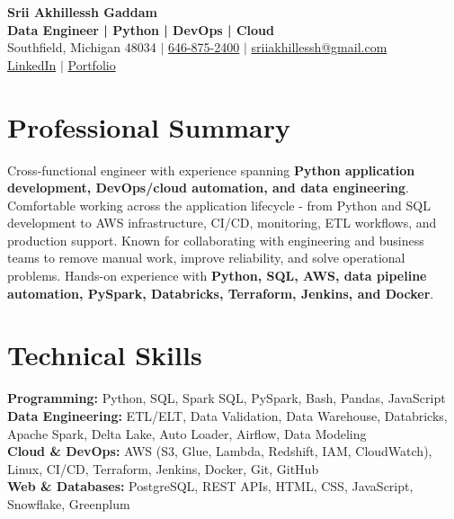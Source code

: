 \documentclass[letterpaper,10pt]{article}
\begin{document}
\fontsize{9.35pt}{10.45pt}\selectfont

\begin{center}
    {\LARGE \textbf{Srii Akhillessh Gaddam}} \\[-1pt]
    \textbf{Data Engineer | Python | DevOps | Cloud} \\[2pt]
    Southfield, Michigan 48034 $|$
    \href{tel:6468752400}{646-875-2400} $|$
    \href{mailto:sriiakhillessh@gmail.com}{sriiakhillessh@gmail.com} \\[1pt]
    \href{https://www.linkedin.com/in/srii-akhiilessh-gaddam-b48668191/}{LinkedIn} $|$
    \href{https://sriiakhillesshg.github.io/portfolio/}{Portfolio}
\end{center}
\vspace{-8pt}

\section{Professional Summary}
\small{Cross-functional engineer with experience spanning \textbf{Python application development, DevOps/cloud automation, and data engineering}. Comfortable working across the application lifecycle - from Python and SQL development to AWS infrastructure, CI/CD, monitoring, ETL workflows, and production support. Known for collaborating with engineering and business teams to remove manual work, improve reliability, and solve operational problems. Hands-on experience with \textbf{Python, SQL, AWS, data pipeline automation, PySpark, Databricks, Terraform, Jenkins, and Docker}.}

\section{Technical Skills}
\small{
\textbf{Programming:} Python, SQL, Spark SQL, PySpark, Bash, Pandas, JavaScript \\
\textbf{Data Engineering:} ETL/ELT, Data Validation, Data Warehouse, Databricks, Apache Spark, Delta Lake, Auto Loader, Airflow, Data Modeling \\
\textbf{Cloud \& DevOps:} AWS (S3, Glue, Lambda, Redshift, IAM, CloudWatch), Linux, CI/CD, Terraform, Jenkins, Docker, Git, GitHub \\
\textbf{Web \& Databases:} PostgreSQL, REST APIs, HTML, CSS, JavaScript, Snowflake, Greenplum
}
\end{document}
